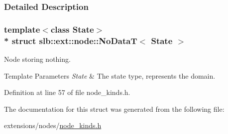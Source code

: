 \subsubsection{Detailed Description}
\subsubsection*{template$<$class State$>$\\*
struct slb\+::ext\+::node\+::\+No\+Data\+T$<$ State $>$}

Node storing nothing. 


\begin{DoxyTemplParams}{Template Parameters}
{\em State} & The state type, represents the domain. \\
\hline
\end{DoxyTemplParams}


Definition at line 57 of file node\+\_\+kinds.\+h.



The documentation for this struct was generated from the following file\+:\begin{DoxyCompactItemize}
\item 
extensions/nodes/\hyperlink{node__kinds_8h}{node\+\_\+kinds.\+h}\end{DoxyCompactItemize}
